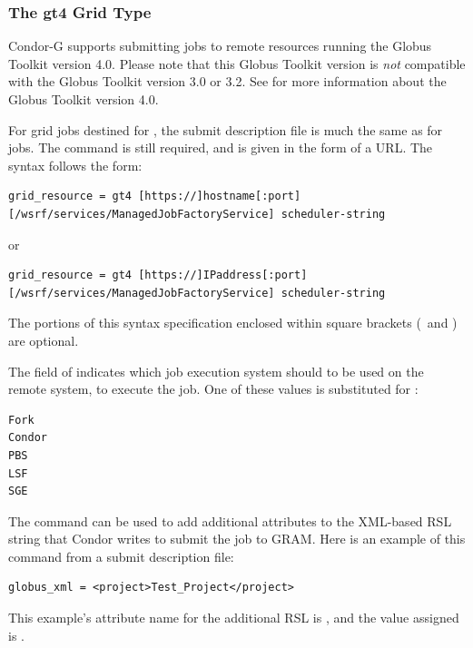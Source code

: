 \subsubsection{\label{sec:Using-gt4}The gt4 Grid Type}

Condor-G supports submitting jobs to remote resources running
the Globus Toolkit version 4.0.
Please note that this Globus Toolkit version
is \emph{not} compatible with the Globus Toolkit version 3.0 or 3.2.
See
for more information about the Globus Toolkit version 4.0.

For grid jobs destined for ,
the submit description file is much the same as for
 jobs.
The  command is still required,
and is given in the form of a URL. 
The syntax follows the form:
\footnotesize
\begin{verbatim}
grid_resource = gt4 [https://]hostname[:port][/wsrf/services/ManagedJobFactoryService] scheduler-string
\end{verbatim}
\normalsize

or
\footnotesize
\begin{verbatim}
grid_resource = gt4 [https://]IPaddress[:port][/wsrf/services/ManagedJobFactoryService] scheduler-string
\end{verbatim}
\normalsize
The portions of this syntax specification enclosed within
square brackets (\Lbr\ and \Rbr) are optional.

The  field of 
indicates which job execution
system should to be used on the remote system, to execute the job. One of
these values is substituted for :
\begin{verbatim}
Fork
Condor
PBS
LSF
SGE
\end{verbatim}


The  command can be used to add additional
attributes to the XML-based RSL string that Condor writes to submit the
job to GRAM.
Here is an example of this command from a submit description file:
\begin{verbatim}
globus_xml = <project>Test_Project</project>
\end{verbatim}
This example's attribute name for the additional RSL is
, and the value assigned is .

